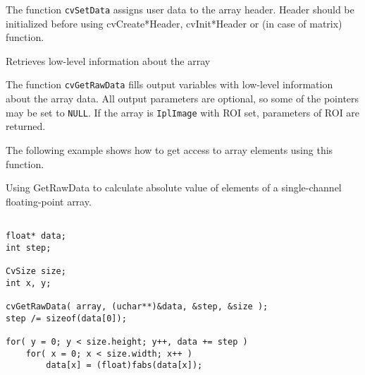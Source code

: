 
\begin{description}
\end{description}


The function \texttt{cvSetData} assigns user data to the array header. Header should be initialized before using cvCreate*Header, cvInit*Header or  (in case of matrix) function.


Retrieves low-level information about the array


\begin{description}
\end{description}

The function \texttt{cvGetRawData} fills output variables with low-level information about the array data. All output parameters are optional, so some of the pointers may be set to \texttt{NULL}. If the array is \texttt{IplImage} with ROI set, parameters of ROI are returned.

The following example shows how to get access to array elements using this function.

Using GetRawData to calculate absolute value of elements of a single-channel floating-point array.

\begin{lstlisting}

float* data;
int step;

CvSize size;
int x, y;

cvGetRawData( array, (uchar**)&data, &step, &size );
step /= sizeof(data[0]);

for( y = 0; y < size.height; y++, data += step )
    for( x = 0; x < size.width; x++ )
        data[x] = (float)fabs(data[x]);

\end{lstlisting}


